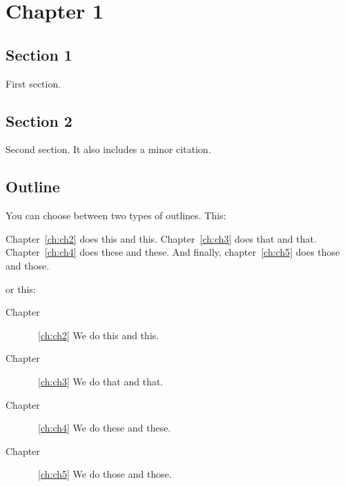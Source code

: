\chapter{Chapter 1}\label{ch:ch1}

\section{Section 1}

First section.

\section{Section 2}

Second section.
It also includes a minor citation\cite{misc_citation}.

\section{Outline}

You can choose between two types of outlines. This:

Chapter~\ref{ch:ch2} does this and this. Chapter~\ref{ch:ch3} does that and
that. Chapter~\ref{ch:ch4} does these and these. And finally,
chapter~\ref{ch:ch5} does those and those.

or this:

\begin{description}
\item[Chapter]~\ref{ch:ch2}
	We do this and this.
\item[Chapter]~\ref{ch:ch3}
	We do that and that.
\item[Chapter]~\ref{ch:ch4}
	We do these and these.
\item[Chapter]~\ref{ch:ch5}
	We do those and those.
\end{description}
